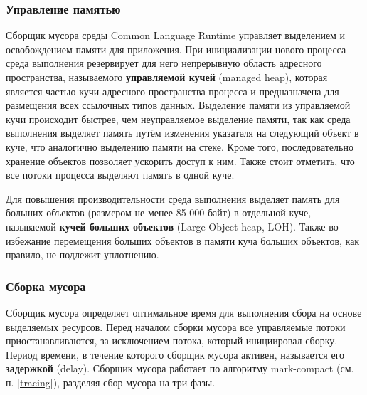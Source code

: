 \subsubsection{Управление памятью}
\label{loh}

Сборщик мусора среды Common Language Runtime управляет выделением и освобождением памяти для приложения. При инициализации нового процесса среда выполнения резервирует для него непрерывную область адресного пространства, называемого \textbf{управляемой кучей} (managed heap), которая является частью кучи адресного пространства процесса и предназначена для размещения всех ссылочных типов данных. Выделение памяти из управляемой кучи происходит быстрее, чем неуправляемое выделение памяти, так как среда выполнения выделяет память путём изменения указателя на следующий объект в куче, что аналогично выделению памяти на стеке. Кроме того, последовательно хранение объектов позволяет ускорить доступ к ним. Также стоит отметить, что все потоки процесса выделяют память в одной куче.~\cite{dotnet_memory}

Для повышения производительности среда выполнения выделяет память для больших объектов (размером не менее 85 000 байт) в отдельной куче, называемой \textbf{кучей больших объектов} (Large Object heap, LOH). Также во избежание перемещения больших объектов в памяти куча больших объектов, как правило, не подлежит уплотнению.~\cite{dotnet_loh}



\subsubsection{Сборка мусора}

Сборщик мусора определяет оптимальное время для выполнения сбора на основе выделяемых ресурсов. Перед началом сборки мусора все управляемые потоки приостанавливаются, за исключением потока, который инициировал сборку. Период времени, в течение которого сборщик мусора активен, называется его \textbf{задержкой} (delay). Сборщик мусора работает по алгоритму mark-compact (см. п. \ref{tracing}), разделяя сбор мусора на три фазы.~\cite{dotnet_gc}

